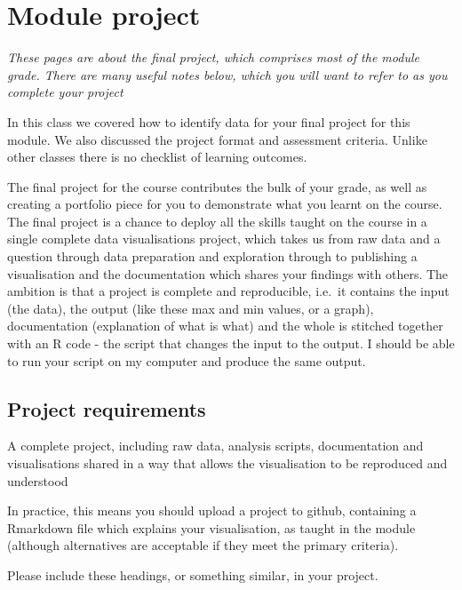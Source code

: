 \documentclass[
]{book}
\begin{document}
\hypertarget{module-project}{%
\chapter*{Module project}\label{module-project}}


\emph{These pages are about the final project, which comprises most of the module grade. There are many useful notes below, which you will want to refer to as you complete your project}

In this class we covered how to identify data for your final project for this module. We also discussed the project format and assessment criteria. Unlike other classes there is no checklist of learning outcomes.

The final project for the course contributes the bulk of your grade, as well as creating a portfolio piece for you to demonstrate what you learnt on the course. The final project is a chance to deploy all the skills taught on the course in a single complete data visualisations project, which takes us from raw data and a question through data preparation and exploration through to publishing a visualisation and the documentation which shares your findings with others. The ambition is that a project is complete and reproducible, i.e.~it contains the input (the data), the output (like these max and min values, or a graph), documentation (explanation of what is what) and the whole is stitched together with an R code - the script that changes the input to the output. I should be able to run your script on my computer and produce the same output.

\hypertarget{requirements}{%
\section{Project requirements}\label{requirements}}

A complete project, including raw data, analysis scripts, documentation and visualisations shared in a way that allows the visualisation to be reproduced and understood

In practice, this means you should upload a project to github, containing a Rmarkdown file which explains your visualisation, as taught in the module (although alternatives are acceptable if they meet the primary criteria).

Please include these headings, or something similar, in your project.
\end{document}
